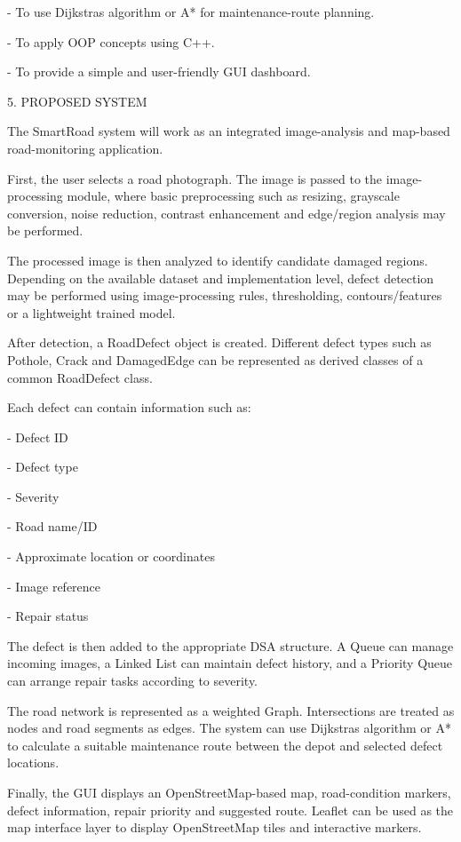 \documentclass[
]{article}
\begin{document}
- To use Dijkstra\textquotesingle s algorithm or A* for
maintenance-route planning.

- To apply OOP concepts using C++.

- To provide a simple and user-friendly GUI dashboard.

5. PROPOSED SYSTEM

The SmartRoad system will work as an integrated image-analysis and
map-based road-monitoring application.

First, the user selects a road photograph. The image is passed to the
image-processing module, where basic preprocessing such as resizing,
grayscale conversion, noise reduction, contrast enhancement and
edge/region analysis may be performed.

The processed image is then analyzed to identify candidate damaged
regions. Depending on the available dataset and implementation level,
defect detection may be performed using image-processing rules,
thresholding, contours/features or a lightweight trained model.

After detection, a RoadDefect object is created. Different defect types
such as Pothole, Crack and DamagedEdge can be represented as derived
classes of a common RoadDefect class.

Each defect can contain information such as:

- Defect ID

- Defect type

- Severity

- Road name/ID

- Approximate location or coordinates

- Image reference

- Repair status

The defect is then added to the appropriate DSA structure. A Queue can
manage incoming images, a Linked List can maintain defect history, and a
Priority Queue can arrange repair tasks according to severity.

The road network is represented as a weighted Graph. Intersections are
treated as nodes and road segments as edges. The system can use
Dijkstra\textquotesingle s algorithm or A* to calculate a suitable
maintenance route between the depot and selected defect locations.

Finally, the GUI displays an OpenStreetMap-based map, road-condition
markers, defect information, repair priority and suggested route.
Leaflet can be used as the map interface layer to display OpenStreetMap
tiles and interactive markers.
\end{document}
